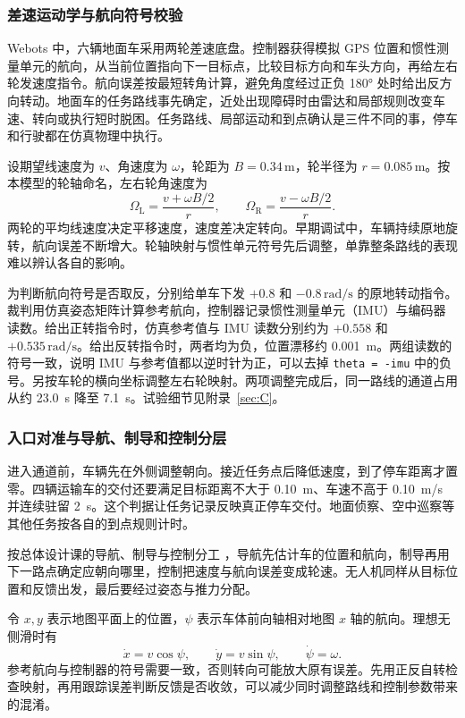 \subsubsection*{差速运动学与航向符号校验}

Webots 中，六辆地面车采用两轮差速底盘。控制器获得模拟 GPS 位置和惯性测量单元的航向，从当前位置指向下一目标点，比较目标方向和车头方向，再给左右轮发速度指令。航向误差按最短转角计算，避免角度经过正负 180° 处时给出反方向转动。地面车的任务路线事先确定，近处出现障碍时由雷达和局部规则改变车速、转向或执行短时脱困。任务路线、局部运动和到点确认是三件不同的事，停车和行驶都在仿真物理中执行。

设期望线速度为 $v$、角速度为 $\omega$，轮距为 $B=0.34\,\mathrm m$，轮半径为 $r=0.085\,\mathrm m$。按本模型的轮轴命名，左右轮角速度为\begin{equation}\Omega_{\mathrm L}=\frac{v+\omega B/2}{r},\qquad \Omega_{\mathrm R}=\frac{v-\omega B/2}{r}.\label{eq:wheel}\end{equation}两轮的平均线速度决定平移速度，速度差决定转向。早期调试中，车辆持续原地旋转，航向误差不断增大。轮轴映射与惯性单元符号先后调整，单靠整条路线的表现难以辨认各自的影响。

为判断航向符号是否取反，分别给单车下发 $+0.8$ 和 $-0.8\,\mathrm{rad/s}$ 的原地转动指令。裁判用仿真姿态矩阵计算参考航向，控制器记录惯性测量单元（IMU）与编码器读数。给出正转指令时，仿真参考值与 IMU 读数分别约为 $+0.558$ 和 $+0.535\,\mathrm{rad/s}$。给出反转指令时，两者均为负，位置漂移约 0.001~m。两组读数的符号一致，说明 IMU 与参考值都以逆时针为正，可以去掉 \texttt{theta = -imu} 中的负号。另按车轮的横向坐标调整左右轮映射。两项调整完成后，同一路线的通道占用从约 23.0~s 降至 7.1~s。试验细节见附录~\ref{sec:C}。

\subsubsection*{入口对准与导航、制导和控制分层}

进入通道前，车辆先在外侧调整朝向。接近任务点后降低速度，到了停车距离才置零。四辆运输车的交付还要满足目标距离不大于 0.10~m、车速不高于 0.10~m/s 并连续驻留 2~s。这个判据让任务记录反映真正停车交付。地面侦察、空中巡察等其他任务按各自的到点规则计时。

按总体设计课的导航、制导与控制分工 \cite{ref1}，导航先估计车的位置和航向，制导再用下一路点确定应朝向哪里，控制把速度与航向误差变成轮速。无人机同样从目标位置和反馈出发，最后要经过姿态与推力分配。

令 $x,y$ 表示地图平面上的位置，$\psi$ 表示车体前向轴相对地图 $x$ 轴的航向。理想无侧滑时有\[ \dot{x}=v\cos\psi,\qquad \dot{y}=v\sin\psi,\qquad \dot{\psi}=\omega . \]参考航向与控制器的符号需要一致，否则转向可能放大原有误差。先用正反自转检查映射，再用跟踪误差判断反馈是否收敛，可以减少同时调整路线和控制参数带来的混淆。

